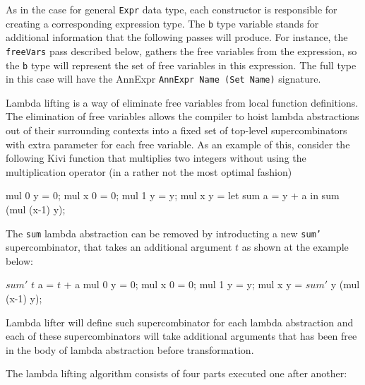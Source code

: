 \documentclass[12pt,a4paper]{report}
\begin{document}
As in the case for general \texttt{Expr} data type, each constructor is
responsible for creating a corresponding expression type. The \texttt{b} type
variable stands for additional information that the following passes will
produce. For instance, the \texttt{freeVars} pass described below, gathers the
free variables from the expression, so the \texttt{b} type will represent the
set of free variables in this expression. The full type in this case will have
the AnnExpr \texttt{AnnExpr Name (Set Name)} signature.

Lambda lifting is a way of eliminate free variables from local function
definitions. The elimination of free variables allows the compiler to hoist
lambda abstractions out of their surrounding contexts into a fixed set of
top-level supercombinators with extra parameter for each free variable. As an
example of this, consider the following Kivi function that multiplies two
integers without using the multiplication operator (in a rather not the most
optimal fashion)

\vspace*{0.2in}
\begin{code}[style=haskell]
mul 0 y = 0;
mul x 0 = 0;
mul 1 y = y;
mul x y =
    let sum a = y + a
    in sum (mul (x-1) y);
\end{code}

The \texttt{sum} lambda abstraction can be removed by introducting a new
\texttt{sum'} supercombinator, that takes an additional argument $t$ as shown at
the example below:

\vspace*{0.2in}
\begin{code}[style=haskell,mathescape=true]
$sum'$ $t$ a = $t$ + a
mul 0 y = 0;
mul x 0 = 0;
mul 1 y = y;
mul x y =
    $sum'$ y (mul (x-1) y);
\end{code}

Lambda lifter will define such supercombinator for each lambda abstraction and
each of these supercombinators will take additional arguments that has been
free in the body of lambda abstraction before transformation.

The lambda lifting algorithm consists of four parts executed one after another:

\vspace*{0.2in}
\end{document}
